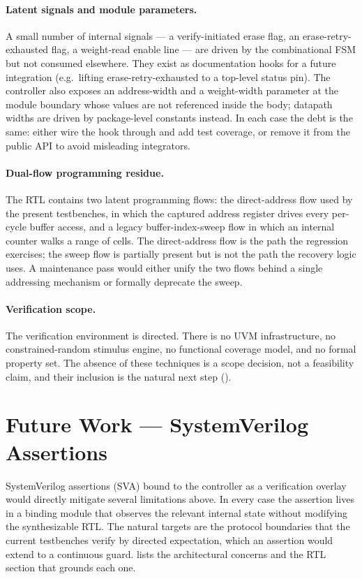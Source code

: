 \paragraph{Latent signals and module parameters.}
A small number of internal signals --- a verify-initiated erase flag, an
erase-retry-exhausted flag, a weight-read enable line --- are driven by
the combinational FSM but not consumed elsewhere. They exist as
documentation hooks for a future integration (e.g.\ lifting
erase-retry-exhausted to a top-level status pin). The controller also
exposes an address-width and a weight-width parameter at the module
boundary whose values are not referenced inside the body; datapath
widths are driven by package-level constants instead. In each case the
debt is the same: either wire the hook through and add test coverage,
or remove it from the public API to avoid misleading integrators.

\paragraph{Dual-flow programming residue.}
The RTL contains two latent programming flows: the direct-address flow
used by the present testbenches, in which the captured address register
drives every per-cycle buffer access, and a legacy buffer-index-sweep
flow in which an internal counter walks a range of cells. The
direct-address flow is the path the regression exercises; the sweep
flow is partially present but is not the path the recovery logic uses.
A maintenance pass would either unify the two flows behind a single
addressing mechanism or formally deprecate the sweep.

\paragraph{Verification scope.}
The verification environment is directed. There is no UVM
infrastructure, no constrained-random stimulus engine, no functional
coverage model, and no formal property set. The absence of these
techniques is a scope decision, not a feasibility claim, and their
inclusion is the natural next step ().

\section{Future Work --- SystemVerilog Assertions}
\label{sec:future-sva}

SystemVerilog assertions (SVA) bound to the controller as a verification
overlay would directly mitigate several limitations above. In every
case the assertion lives in a binding module that observes the relevant
internal state without modifying the synthesizable RTL. The natural
targets are the protocol boundaries that the current testbenches verify
by directed expectation, which an assertion would extend to a continuous
guard.  lists the architectural concerns and the
RTL section that grounds each one.

